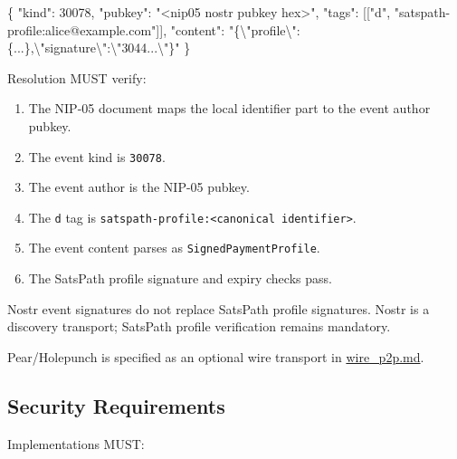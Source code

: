 \documentclass[
]{article}
\newenvironment{Shaded}{}{}
\newcommand{\CharTok}[1]{\textcolor[rgb]{0.25,0.44,0.63}{#1}}
\newcommand{\DataTypeTok}[1]{\textcolor[rgb]{0.56,0.13,0.00}{#1}}
\newcommand{\DecValTok}[1]{\textcolor[rgb]{0.25,0.63,0.44}{#1}}
\newcommand{\FunctionTok}[1]{\textcolor[rgb]{0.02,0.16,0.49}{#1}}
\newcommand{\OtherTok}[1]{\textcolor[rgb]{0.00,0.44,0.13}{#1}}
\newcommand{\StringTok}[1]{\textcolor[rgb]{0.25,0.44,0.63}{#1}}
\providecommand{\tightlist}{%
  \setlength{\itemsep}{0pt}\setlength{\parskip}{0pt}}
\begin{document}
\begin{Shaded}
\begin{Highlighting}[]
\FunctionTok{\{}
  \DataTypeTok{"kind"}\FunctionTok{:} \DecValTok{30078}\FunctionTok{,}
  \DataTypeTok{"pubkey"}\FunctionTok{:} \StringTok{"\textless{}nip05 nostr pubkey hex\textgreater{}"}\FunctionTok{,}
  \DataTypeTok{"tags"}\FunctionTok{:} \OtherTok{[[}\StringTok{"d"}\OtherTok{,} \StringTok{"satspath{-}profile:alice@example.com"}\OtherTok{]]}\FunctionTok{,}
  \DataTypeTok{"content"}\FunctionTok{:} \StringTok{"\{}\CharTok{\textbackslash{}"}\StringTok{profile}\CharTok{\textbackslash{}"}\StringTok{:\{...\},}\CharTok{\textbackslash{}"}\StringTok{signature}\CharTok{\textbackslash{}"}\StringTok{:}\CharTok{\textbackslash{}"}\StringTok{3044...}\CharTok{\textbackslash{}"}\StringTok{\}"}
\FunctionTok{\}}
\end{Highlighting}
\end{Shaded}

Resolution MUST verify:

\begin{enumerate}
\def\labelenumi{\arabic{enumi}.}
\tightlist
\item
  The NIP-05 document maps the local identifier part to the event author
  pubkey.
\item
  The event kind is \texttt{30078}.
\item
  The event author is the NIP-05 pubkey.
\item
  The \texttt{d} tag is
  \texttt{satspath-profile:\textless{}canonical\ identifier\textgreater{}}.
\item
  The event content parses as \texttt{SignedPaymentProfile}.
\item
  The SatsPath profile signature and expiry checks pass.
\end{enumerate}

Nostr event signatures do not replace SatsPath profile signatures. Nostr
is a discovery transport; SatsPath profile verification remains
mandatory.

Pear/Holepunch is specified as an optional wire transport in
\href{./wire_p2p.md}{wire\_p2p.md}.

\hypertarget{security-requirements}{%
\subsection{Security Requirements}\label{security-requirements}}

Implementations MUST:
\end{document}
